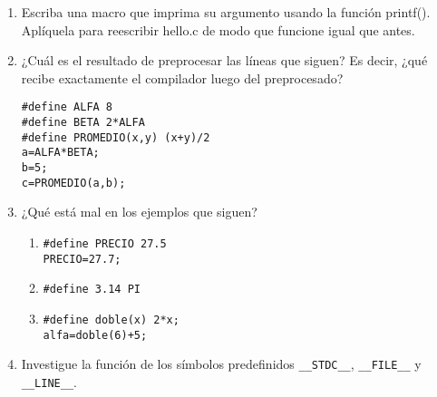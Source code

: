 \begin{enumerate}
\item  Escriba una macro que imprima su argumento usando la función printf(). Aplíquela para reescribir
hello.c de modo que funcione igual que antes.
\item  ¿Cuál es el resultado de preprocesar las líneas que siguen? Es decir, ¿qué recibe exactamente el
compilador luego del preprocesado?
\begin{lstlisting}
#define ALFA 8
#define BETA 2*ALFA
#define PROMEDIO(x,y) (x+y)/2
a=ALFA*BETA;
b=5;
c=PROMEDIO(a,b);
\end{lstlisting}
\item  ¿Qué está mal en los ejemplos que siguen?
	\begin{enumerate}[label=\alph*.]

\item  
\begin{lstlisting}
#define PRECIO 27.5
PRECIO=27.7;
\end{lstlisting}

\item  
\begin{lstlisting}
#define 3.14 PI
\end{lstlisting}

\item  
\begin{lstlisting}
#define doble(x) 2*x;
alfa=doble(6)+5;
\end{lstlisting}
\end{enumerate}
\item Investigue la función de los símbolos predefinidos \lstinline{__STDC__}, \lstinline{__FILE__} y \lstinline{__LINE__}.
\end{enumerate}


